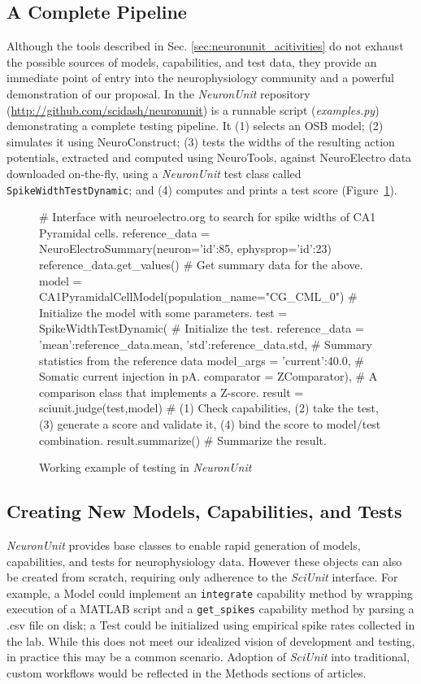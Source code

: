 \documentclass{frontiersSCNS}
\let\verbx\lstinline
\begin{document}
\subsection{A Complete Pipeline}
Although the tools described in Sec. \ref{sec:neuronunit_acitivities} do not exhaust the possible sources of models, capabilities, and test data, they provide an immediate point of entry into the neurophysiology community and a powerful demonstration of our proposal. 
In the \textit{NeuronUnit} repository (\url{http://github.com/scidash/neuronunit}) is a runnable script (\textit{examples.py}) demonstrating a complete testing pipeline. 
It (1) selects an OSB model; 
(2) simulates it using NeuroConstruct; 
(3) tests the widths of the resulting action potentials, extracted and computed using NeuroTools, against NeuroElectro data downloaded on-the-fly, using a \textit{NeuronUnit} test class called \verbx{SpikeWidthTestDynamic}; 
and (4) computes and prints a test score (Figure~\ref{fig:neuronunit_example}).

\begin{figure}
\begin{python}
# Interface with neuroelectro.org to search for spike widths of CA1 Pyramidal cells. 
reference_data = NeuroElectroSummary(neuron={'id':85}, ephysprop={'id':23})
reference_data.get_values()  # Get summary data for the above. 
model = CA1PyramidalCellModel(population_name="CG_CML_0") # Initialize the model with some parameters.
test = SpikeWidthTestDynamic( # Initialize the test.    
	reference_data = {'mean':reference_data.mean, 'std':reference_data.std}, # Summary statistics from the reference data
	model_args = {'current':40.0}, # Somatic current injection in pA.  
	comparator = ZComparator), # A comparison class that implements a Z-score.  
result = sciunit.judge(test,model) # (1) Check capabilities, (2) take the test, (3) generate a score and validate it, (4) bind the score to model/test combination. 
result.summarize() # Summarize the result.  
\end{python}
\caption{Working example of testing in \textit{NeuronUnit}}
\label{fig:neuronunit_example}
\vspace{-15px}
\end{figure}

\subsection{Creating New Models, Capabilities, and Tests}
\textit{NeuronUnit} provides base classes to enable rapid generation of models, capabilities, and tests for neurophysiology data. 
However these objects can also be created from scratch, requiring only adherence to the \textit{SciUnit} interface. 
For example, a Model could implement an \verbx{integrate} capability method by wrapping execution of a MATLAB script and a \verbx{get_spikes} capability method by parsing a .csv file on disk; 
a Test could be initialized using empirical spike rates collected in the lab.  
While this does not meet our idealized vision of development and testing, in practice this may be a common scenario. 
Adoption of \textit{SciUnit} into traditional, custom workflows would be reflected in the Methods sections of articles.  
\end{document}
